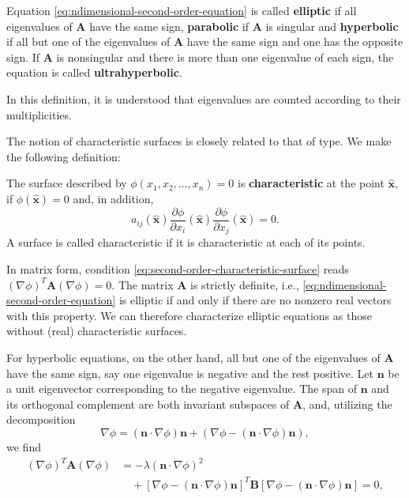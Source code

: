 \begin{Definition}
\label{def:ndimensional-second-order-type}
Equation \eqref{eq:ndimensional-second-order-equation} is called \textbf{elliptic} if all eigenvalues of $\bm{A}$ have the same sign, \textbf{parabolic} if $\bm{A}$ is singular and \textbf{hyperbolic} if all but one of the eigenvalues of $\bm{A}$ have the same sign and one has the opposite sign. If $\bm{A}$ is nonsingular and there is more than one eigenvalue of each sign, the equation is called \textbf{ultrahyperbolic}.
\end{Definition}

In this definition, it is understood that eigenvalues are counted according to their multiplicities.

The notion of characteristic surfaces is closely related to that of type. We make the following definition:

\begin{Definition}
\label{def:second-order-characteristic-surface}
The surface described by $\phi(x_1,x_2,\ldots,x_n)=0$ is \textbf{characteristic} at the point $\hat{\bm{x}}$, if $\phi(\hat{\bm{x}})=0$ and, in addition,
\begin{equation}\label{eq:second-order-characteristic-surface}
a_{ij}(\hat{\bm{x}})\dfrac{\partial\phi}{\partial x_i}(\hat{\bm{x}})\dfrac{\partial\phi}{\partial x_j}(\hat{\bm{x}})=0.
\end{equation}
A surface is called characteristic if it is characteristic at each of its points.
\end{Definition}

In matrix form, condition \eqref{eq:second-order-characteristic-surface} reads $(\nabla\phi)^T\bm{A}(\nabla\phi)=0$. The matrix $\bm{A}$ is strictly definite, i.e., \eqref{eq:ndimensional-second-order-equation} is elliptic if and only if there are no nonzero real vectors with this property. We can therefore characterize elliptic equations as those without (real) characteristic surfaces.

For hyperbolic equations, on the other hand, all but one of the eigenvalues of $\bm{A}$ have the same sign, say one eigenvalue is negative and the rest positive. Let $\bm{n}$ be a unit eigenvector corresponding to the negative eigenvalue. The span of $\bm{n}$ and its orthogonal complement are both invariant subspaces of $\bm{A}$, and, utilizing the decomposition
\begin{equation}\label{eq:characteristic-gradient-decomposition}
\nabla\phi=(\bm{n}\cdot\nabla\phi)\bm{n}+(\nabla\phi-(\bm{n}\cdot\nabla\phi)\bm{n}),
\end{equation}
we find
\begin{equation}\label{eq:hyperbolic-characteristic-cone}
\begin{aligned}
(\nabla\phi)^T\bm{A}(\nabla\phi)
&=-\lambda(\bm{n}\cdot\nabla\phi)^2\\
&\quad+[\nabla\phi-(\bm{n}\cdot\nabla\phi)\bm{n}]^T
\bm{B}[\nabla\phi-(\bm{n}\cdot\nabla\phi)\bm{n}]=0,
\end{aligned}
\end{equation}


